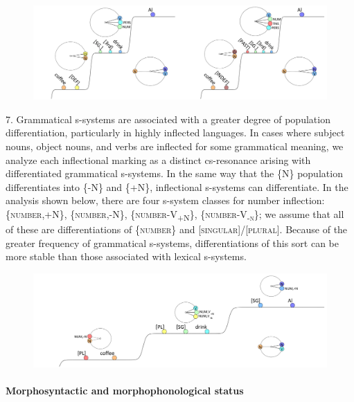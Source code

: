   
\begin{figure}
\includegraphics[width=\textwidth]{figures/Tilsen-img66.png}
\caption{\missingcaption}
\label{fig:}
\end{figure}
 

7. Grammatical s-systems are associated with a greater degree of population differentiation, particularly in highly inflected languages. In cases where subject nouns, object nouns, and verbs are inflected for some grammatical meaning, we analyze each inflectional marking as a distinct cs-resonance arising with differentiated grammatical s-systems. In the same way that the \{N\} population differentiates into \{-N\} and \{+N\}, inflectional s-systems can differentiate. In the analysis shown below, there are four s-system classes for number inflection: \{\textsc{number},+N\}, \{\textsc{number},-N\}, \{\textsc{number}{}-\textsc{V}\textsc{\textsubscript{+N}}\textsc{\}}, \{\textsc{number}{}-\textsc{V}\textsc{\textsubscript{{}-n}}\textsc{\};} we assume that all of these are differentiations of \{\textsc{number}\} and [\textsc{singular}]/[\textsc{plural}]. Because of the greater frequency of grammatical s-systems, differentiations of this sort can be more stable than those associated with lexical s-systems. 

  
\begin{figure}
\includegraphics[width=\textwidth]{figures/Tilsen-img67.png}
\caption{\missingcaption}
\label{fig:}
\end{figure}
 

\paragraph{Morphosyntactic and morphophonological status}

